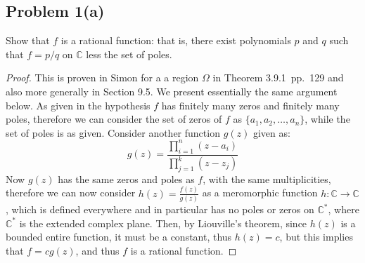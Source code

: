 \documentclass{article}[12pt]
\def\CC{{\mathbb C}}
\begin{document}
\subsection*{Problem 1(a)}Show that $f$ is a rational function: that is,
there exist polynomials $p$ and $q$ such that $f=p/q$ on $\CC$ less
the set of poles.
\begin{proof}
This is proven in Simon for a a region $\Omega$ in Theorem 3.9.1~pp.~129
and also more generally in Section 9.5. We present essentially the
same argument below.
As given in the hypothesis $f$ has finitely many zeros and finitely many
poles, therefore we can consider the set of zeros of $f$ as
$\{a_1,a_2,\ldots,a_n\}$, while the set of poles is as given.
Consider another function $g(z)$ given as:
\[
g(z)= \frac{\prod_{i=1}^n (z-a_i)}{\prod_{j=1}^k (z-z_j)}
\]
Now $g(z)$ has the same zeros and poles as $f$, with the same 
multiplicities, therefore we can now consider $h(z)=\frac{f(z)}{g(z)}$
as a meromorphic function $h:\CC\to\CC$, which is defined
everywhere and in particular has no poles or zeros on $\CC^*$, where
$\CC^*$ is the extended complex plane. 
Then, by Liouville's theorem,
since $h(z)$ is a bounded entire function, it must be a constant,
thus $h(z)=c$, but this implies that $f=cg(z)$, and thus $f$ is
a rational function.
\end{proof}
\end{document}
